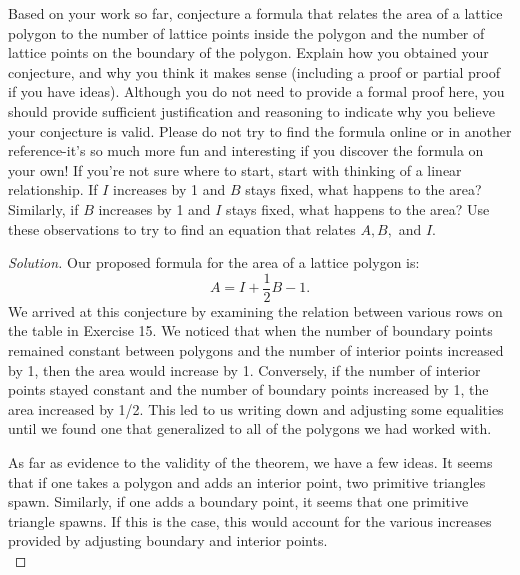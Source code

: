 \documentclass[12pt]{article}
\newenvironment{exercise}[2][Exercise]{\begin{trivlist}
        \item[\hskip \labelsep {\bfseries #1}\hskip \labelsep {\bfseries #2.}]}{\end{trivlist}}
\newenvironment{solution}
        {\begin{proof}[Solution]}
                    {\end{proof}}
\begin{document}
\begin{exercise}{18}
    Based on your work so far, conjecture a formula that relates the area of a lattice polygon to the number of lattice points inside the polygon and the number of lattice points on the boundary of the polygon. Explain how you obtained your conjecture, and why you think it makes sense (including a proof or partial proof if you have ideas). Although you do not need to provide a formal proof here, you should provide sufficient justification and reasoning to indicate why you believe your conjecture is valid. Please do not try to find the formula online or in another reference-it's so much more fun and interesting if you discover the formula on your own! If you're not sure where to start, start with thinking of a linear relationship. If \( I \) increases by 1 and \( B \) stays fixed, what happens to the area? Similarly, if \( B \) increases by 1 and \( I \) stays fixed, what happens to the area? Use these observations to try to find an equation that relates \( A, B, \) and \( I. \)
    \begin{solution}
        Our proposed formula for the area of a lattice polygon is:
        $$ A = I + \frac{1}{2} B -1.$$
        We arrived at this conjecture by examining the relation between various rows on the table in Exercise 15. We noticed that when the number of boundary points remained constant between polygons and the number of interior points increased by 1, then the area would increase by 1. Conversely, if the number of interior points stayed constant and the number of boundary points increased by 1, the area increased by 1/2. This led to us writing down and adjusting some equalities until we found one that generalized to all of the polygons we had worked with.

        As far as evidence to the validity of the theorem, we have a few ideas. It seems that if one takes a polygon and adds an interior point, two primitive triangles spawn. Similarly, if one adds a boundary point, it seems that one primitive triangle spawns. If this is the case, this would account for the various increases provided by adjusting boundary and interior points.\\
    \end{solution}
\end{exercise}
\end{document}
